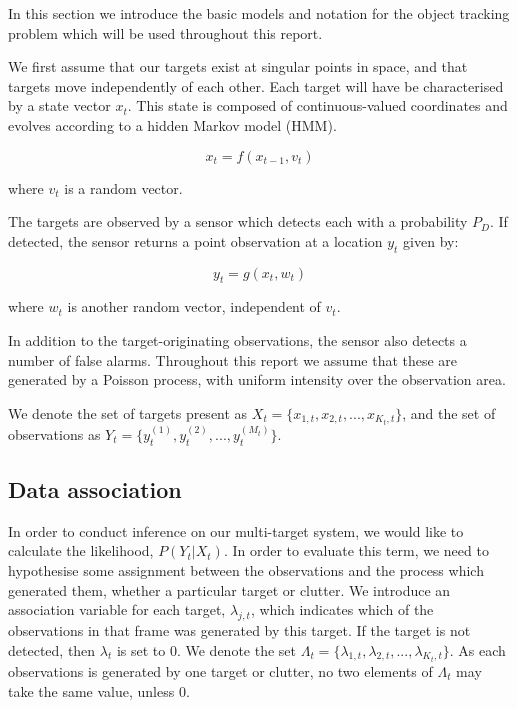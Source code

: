 In this section we introduce the basic models and notation for the object tracking problem which will be used throughout this report.

We first assume that our targets exist at singular points in space, and that targets move independently of each other. Each target will have be characterised by a state vector $x_t$. This state is composed of continuous-valued coordinates and evolves according to a hidden Markov model (HMM).

\begin{equation}
x_t = f(x_{t-1}, v_t)
\end{equation}

where $v_t$ is a random vector.

The targets are observed by a sensor which detects each with a probability $P_D$. If detected, the sensor returns a point observation at a location $y_t$ given by:

\begin{equation}
y_t = g(x_t, w_t)
\end{equation}

where $w_t$ is another random vector, independent of $v_t$.

In addition to the target-originating observations, the sensor also detects a number of false alarms. Throughout this report we assume that these are generated by a Poisson process, with uniform intensity over the observation area.

We denote the set of targets present as $X_t = \{x_{1,t}, x_{2,t}, ... , x_{K_t, t} \}$, and the set of observations as $Y_t = \{y_t^{(1)}, y_t^{(2)}, ... , y_t^{(M_t)} \}$.



\subsection{Data association}

In order to conduct inference on our multi-target system, we would like to calculate the likelihood, $P(Y_t|X_t)$. In order to evaluate this term, we need to hypothesise some assignment between the observations and the process which generated them, whether a particular target or clutter. We introduce an association variable for each target, $\lambda_{j,t}$, which indicates which of the observations in that frame was generated by this target. If the target is not detected, then $\lambda_t$ is set to 0. We denote the set $\Lambda_t = \{\lambda_{1,t}, \lambda_{2,t}, ... , \lambda_{K_t, t} \}$. As each observations is generated by one target or clutter, no two elements of $\Lambda_t$ may take the same value, unless 0.

